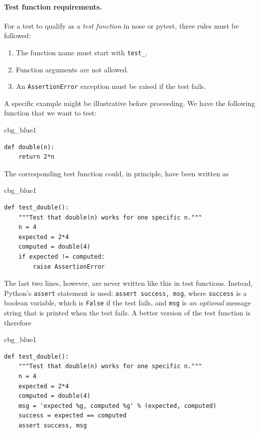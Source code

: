 \documentclass[%
oneside,                 %
final,                   %
10pt]{article}
\newenvironment{_cod_tight}[1]{
   \def\FrameCommand{\colorbox{#1}}
   \FrameRule0.6pt\MakeFramed {\FrameRestore}\vskip3mm}
   {\vskip0mm\endMakeFramed}
\newenvironment{cod}[1]{
\bgroup\rmfamily
\fboxsep=0mm\relax
\begin{_cod_tight}{#1}
\list{}{\parsep=-2mm\parskip=0mm\topsep=0pt\leftmargin=2mm
\rightmargin=2\leftmargin\leftmargin=4pt\relax}
\item\relax}
{\endlist\end{_cod_tight}\egroup}
\begin{document}
\paragraph{Test function requirements.}
For a test to qualify as a \emph{test function} in nose or pytest, three
rules must be followed:

\begin{enumerate}
 \item The function name must start with \Verb!test_!.

 \item Function arguments are not allowed.

 \item An \texttt{AssertionError} exception must be raised if the test fails.
\end{enumerate}

\noindent
A specific example might be illustrative before proceeding.
We have the following function that we want to test:

\begin{cod}{cbg_blue1}\begin{Verbatim}[numbers=none,fontsize=\fontsize{9pt}{9pt},baselinestretch=0.95,xleftmargin=2mm]
def double(n):
    return 2*n
\end{Verbatim}
\end{cod}
\noindent
The corresponding test function could, in principle, have been written
as

\begin{cod}{cbg_blue1}\begin{Verbatim}[numbers=none,fontsize=\fontsize{9pt}{9pt},baselinestretch=0.95,xleftmargin=2mm]
def test_double():
    """Test that double(n) works for one specific n."""
    n = 4
    expected = 2*4
    computed = double(4)
    if expected != computed:
        raise AssertionError
\end{Verbatim}
\end{cod}
\noindent
The last two lines, however, are never written like this in test functions.
Instead, Python's \texttt{assert} statement is used: \texttt{assert success, msg}, where
\texttt{success} is a boolean variable, which is \texttt{False} if the test fails, and
\texttt{msg} is \emph{an optional} message string that is printed when the test fails.
A better version of the test function is therefore

\begin{cod}{cbg_blue1}\begin{Verbatim}[numbers=none,fontsize=\fontsize{9pt}{9pt},baselinestretch=0.95,xleftmargin=2mm]
def test_double():
    """Test that double(n) works for one specific n."""
    n = 4
    expected = 2*4
    computed = double(4)
    msg = 'expected %g, computed %g' % (expected, computed)
    success = expected == computed
    assert success, msg
\end{Verbatim}
\end{cod}
\noindent
\end{document}
